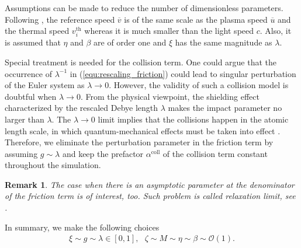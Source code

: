 \documentclass{article}
\newtheorem*{remark}{Remark}
\begin{document}
 Assumptions can be made to reduce the number of dimensionless parameters. Following \cite[][Sec. 2.2]{degond_2017}, the reference speed $\overline{v}$ is of the same scale as the plasma speed $\overline{u}$ and the thermal speed $v_i^{\text{th}}$ whereas it is much smaller than the light speed $c$. Also, it is assumed that $\eta$ and $\beta$ are of order one and $\xi$ has the same magnitude as $\lambda$. 

Special treatment is needed for the collision term. One could argue that the occurrence of $\lambda^{-1}$ in (\ref{equ:rescaling_friction}) could lead to singular perturbation of the Euler system as $\lambda \rightarrow 0$. However, the validity of such a collision model is doubtful when $\lambda \rightarrow 0$. From the physical viewpoint, the shielding effect characterized by the rescaled Debye length $\lambda$ makes the impact parameter no larger than $\lambda$. The $\lambda \rightarrow 0$ limit implies that the collisions happen in the atomic length scale, in which quantum-mechanical effects must be taken into effect \cite[][pp. 144-148]{frank_1972}. Therefore, we eliminate the perturbation parameter in the friction term by assuming $g \sim \lambda$ and keep the prefactor $\alpha^{\text{coll}}$ of the collision term constant throughout the simulation.

\begin{remark}
    The case when there is an asymptotic parameter at the denominator of the friction term is of interest, too. Such problem is called relaxation limit, see \cite{peng_2011, wasiolek_2016, Li_2021, Chen_2000}.
\end{remark}

In summary, we make the following choices \cite[][sec 2.2]{degond_2017}
\begin{align*}
    \xi \sim g \sim \lambda \in [0,1], \ \ \ \zeta \sim M \sim \eta \sim \beta \sim \mathcal{O}(1).
\end{align*}
\end{document}
